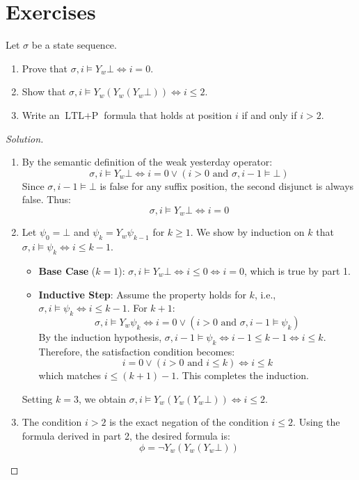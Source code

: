 \section*{Exercises}

\begin{chapex}
Let $\sigma$ be a state sequence.
\begin{enumerate}
    \item Prove that $\sigma, i \models Y_w \bot \iff i = 0$.
    \item Show that $\sigma, i \models Y_w(Y_w(Y_w \bot)) \iff i \le 2$.
    \item Write an $\text{LTL}+\text{P}$ formula that holds at position $i$ if and only if $i > 2$.
\end{enumerate}
\end{chapex}
\begin{proof}[Solution]
\begin{enumerate}
    \item By the semantic definition of the weak yesterday operator:
          \[
            \sigma, i \models Y_w \bot \iff i = 0 \lor (i > 0 \text{ and } \sigma, i-1 \models \bot)
          \]
          Since $\sigma, i-1 \models \bot$ is false for any suffix position, the second disjunct is always false. Thus:
          \[
            \sigma, i \models Y_w \bot \iff i = 0
          \]
    \item Let $\psi_0 = \bot$ and $\psi_k = Y_w \psi_{k-1}$ for $k \ge 1$. We show by induction on $k$ that $\sigma, i \models \psi_k \iff i \le k - 1$.
          \begin{itemize}
              \item \textbf{Base Case} ($k=1$): $\sigma, i \models Y_w \bot \iff i \le 0 \iff i=0$, which is true by part 1.
              \item \textbf{Inductive Step}: Assume the property holds for $k$, i.e., $\sigma, i \models \psi_k \iff i \le k - 1$. For $k+1$:
                    \[
                      \sigma, i \models Y_w \psi_k \iff i = 0 \lor (i > 0 \text{ and } \sigma, i-1 \models \psi_k)
                    \]
                    By the induction hypothesis, $\sigma, i-1 \models \psi_k \iff i-1 \le k - 1 \iff i \le k$.
                    Therefore, the satisfaction condition becomes:
                    \[
                      i = 0 \lor (i > 0 \text{ and } i \le k) \iff i \le k
                    \]
                    which matches $i \le (k+1) - 1$. This completes the induction.
          \end{itemize}
          Setting $k=3$, we obtain $\sigma, i \models Y_w(Y_w(Y_w \bot)) \iff i \le 2$.
    \item The condition $i > 2$ is the exact negation of the condition $i \le 2$. Using the formula derived in part 2, the desired formula is:
          \[
            \phi = \neg Y_w(Y_w(Y_w \bot))
          \]
\end{enumerate}
\end{proof}

